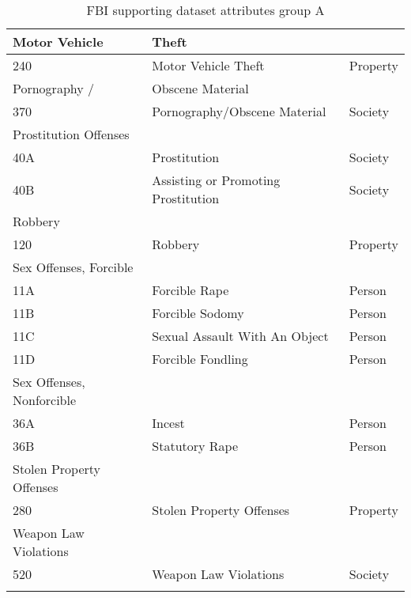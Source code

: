 \begin{center}
\begin{longtable}{|m{8em} m{16em} m{7em}|}
    Motor Vehicle & Theft & \\
    \hline
    240 &
    Motor Vehicle Theft &
    Property\\
    \hline

    Pornography / & Obscene Material & \\
    \hline
    370 &
    Pornography/Obscene Material &
    Society\\
    \hline

    Prostitution Offenses & & \\
    \hline
    40A &
    Prostitution &
    Society\\
    \hline
    40B &
    Assisting or Promoting Prostitution &
    Society\\
    \hline

    Robbery & & \\
    \hline
    120 &
    Robbery &
    Property\\
    \hline

    Sex Offenses, Forcible & & \\
    \hline
    11A &
    Forcible Rape &
    Person\\
    \hline
    11B &
    Forcible Sodomy &
    Person\\
    \hline
    11C &
    Sexual Assault With An Object &
    Person\\
    \hline
    11D &
    Forcible Fondling &
    Person\\
    \hline

    Sex Offenses, Nonforcible & & \\
    \hline
    36A &
    Incest &
    Person\\
    \hline
    36B &
    Statutory Rape &
    Person\\
    \hline

    Stolen Property Offenses & & \\
    \hline
    280 &
    Stolen Property Offenses &
    Property\\
    \hline

    Weapon Law Violations & & \\
    \hline
    520 &
    Weapon Law Violations &
    Society\\
    \hline
\caption{FBI supporting dataset attributes group A}
\end{longtable}
\end{center}


